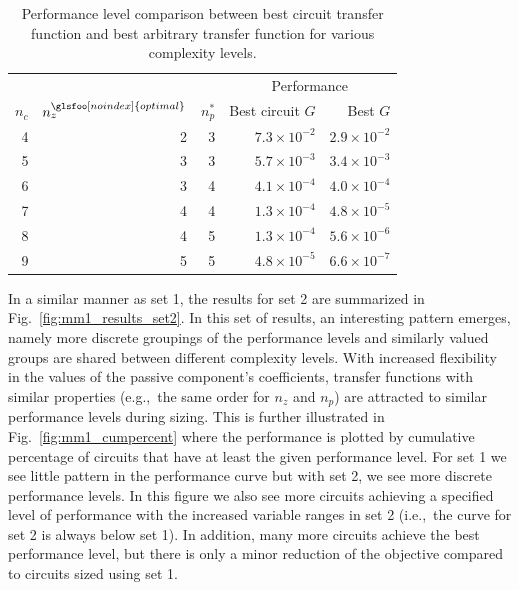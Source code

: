 \begin{table}[ht]
\centering
\caption[Performance comparison between best and arbitrary circuit transfer functions.]{Performance level comparison between best circuit transfer function and best arbitrary transfer function for various complexity levels.\label{tb:ch6:mm1:besttransfer}}
\begin{tabular}{rrrrr}
\hline \hline
& & & \multicolumn{2}{c}{Performance} \\
$n_c$ & $n_z^{\glsfoo[noindex]{optimal}}$ & $n_p^*$ & Best circuit $G$ & Best $G$ \\
\hline
4 & 2 & 3 & $7.3\times10^{-2}$ & $2.9\times10^{-2}$ \\
5 & 3 & 3 & $5.7\times10^{-3}$ & $3.4\times10^{-3}$ \\
6 & 3 & 4 & $4.1\times10^{-4}$ & $4.0\times10^{-4}$ \\
7 & 4 & 4 & $1.3\times10^{-4}$ & $4.8\times10^{-5}$ \\
8 & 4 & 5 & $1.3\times10^{-4}$ & $5.6\times10^{-6}$ \\
9 & 5 & 5 & $4.8\times10^{-5}$ & $6.6\times10^{-7}$  \\
\hline \hline
\end{tabular}
\end{table}

In a similar manner as set 1, the results for set 2 are summarized in
Fig.~\ref{fig:mm1_results_set2}.
In this set of results, an interesting pattern emerges, namely more discrete groupings of the performance levels and similarly valued groups are shared between different complexity levels.
With increased flexibility in the values of the passive component's coefficients, transfer functions with similar properties (e.g.,~the same order for $n_z$ and $n_p$) are attracted to similar performance levels during sizing.
This is further illustrated in Fig.~\ref{fig:mm1_cumpercent} where the performance is plotted by cumulative percentage of circuits that have at least the given performance level.
For set 1 we see little pattern in the performance curve but with set 2, we see more discrete performance levels.
In this figure we also see more circuits achieving a specified level of performance with the increased variable ranges in set 2 (i.e.,~the curve for set 2 is always below set 1).
In addition, many more circuits achieve the best performance level, but there is only a minor reduction of the objective compared to circuits sized using set 1.



